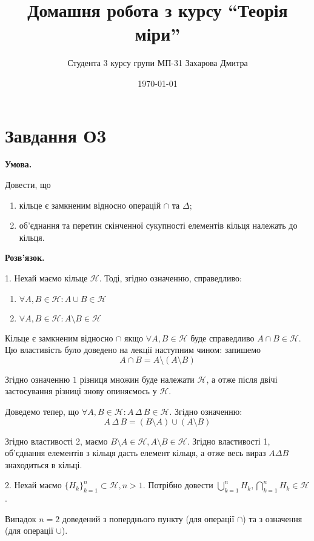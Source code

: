 \documentclass[12pt]{extarticle}
\title{Домашня робота з курсу ``Теорія міри''}
\author{Студента 3 курсу групи МП-31 Захарова Дмитра}
\date{\today}
\begin{document}
\maketitle

\section*{Завдання О3}

\textbf{Умова.} 

Довести, що

\begin{enumerate}
    \item кільце є замкненим відносно операцій $\cap$ та $\Delta$;
    \item об'єднання та перетин скінченної сукупності елементів кільця належать до кільця.
\end{enumerate}

\textbf{Розв'язок.} 

1. Нехай маємо кільце $\mathcal{H}$. Тоді, згідно означенню, справедливо:
\begin{enumerate}
    \item $\forall A, B \in \mathcal{H}: A \cup B \in \mathcal{H}$
    \item $\forall A, B \in \mathcal{H}: A \setminus B \in \mathcal{H}$
\end{enumerate}

Кільце є замкненим відносно $\cap$ якщо $\forall A, B \in \mathcal{H}$ буде справедливо $A \cap B \in \mathcal{H}$. Цю властивість було доведено на лекції наступним чином: запишемо
\[
A \cap B = A \setminus (A \setminus B)
\]

Згідно означенню $1$ різниця множин буде належати $\mathcal{H}$, а отже після двічі застосування різниці знову опиняємось у $\mathcal{H}$.

Доведемо тепер, що $\forall A, B \in \mathcal{H}: A \,\Delta\, B \in \mathcal{H}$. Згідно означенню:
\[
A \, \Delta \, B = (B \setminus A) \cup (A \setminus B)
\]

Згідно властивості 2, маємо $B \setminus A \in \mathcal{H}, A \setminus B \in \mathcal{H}$. Згідно властивості 1, об'єднання елементів з кільця дасть елемент кільця, а отже весь вираз $A \Delta B$ знаходиться в кільці. 

2. Нехай маємо $\{H_k\}_{k=1}^n \subset \mathcal{H}, n>1$. Потрібно довести $\bigcup_{k=1}^n H_k, \bigcap_{k=1}^n H_k \in \mathcal{H}$. 

Випадок $n=2$ доведений з поперднього пункту (для операції $\cap$) та з означення (для операції $\cup$). 
\end{document}
